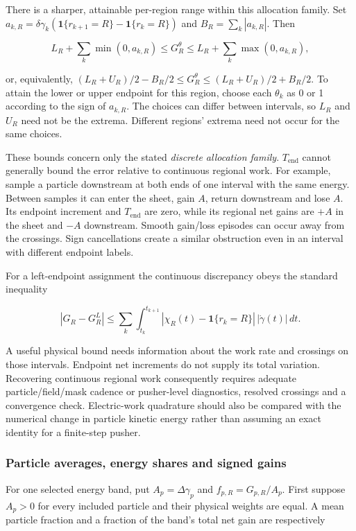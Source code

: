 There is a sharper, attainable per-region range within this allocation
family. Set
\(a_{k,R}=\delta\gamma_k(\mathbf1\{r_{k+1}=R\}-\mathbf1\{r_k=R\})\) and
\(B_R=\sum_k|a_{k,R}|\). Then

\[
L_R+\sum_k\min(0,a_{k,R})\leq G_R^{\theta}
\leq L_R+\sum_k\max(0,a_{k,R}),
\]

or, equivalently, \((L_R+U_R)/2-B_R/2\leq G_R^{\theta}
\leq(L_R+U_R)/2+B_R/2\). To attain the lower or upper endpoint for this
region, choose each \(\theta_k\) as 0 or 1 according to the sign of
\(a_{k,R}\). The choices can differ between intervals, so \(L_R\) and
\(U_R\) need not be the extrema. Different regions' extrema need not
occur for the same choices.

These bounds concern only the stated \emph{discrete allocation family}.
\(T_{\mathrm{end}}\) cannot generally bound the error relative to
continuous regional work. For example, sample a particle downstream at
both ends of one interval with the same energy. Between samples it can
enter the sheet, gain \(A\), return downstream and lose \(A\). Its
endpoint increment and \(T_{\mathrm{end}}\) are zero, while its regional
net gains are \(+A\) in the sheet and \(-A\) downstream. Smooth
gain/loss episodes can occur away from the crossings. Sign cancellations
create a similar obstruction even in an interval with different endpoint
labels.

For a left-endpoint assignment the continuous discrepancy obeys the
standard inequality

\[
|G_R-G_R^L|\leq\sum_k\int_{t_k}^{t_{k+1}}
 |\chi_R(t)-\mathbf1\{r_k=R\}|\,|\dot\gamma(t)|\,dt.
\]

A useful physical bound needs information about the work rate and
crossings on those intervals. Endpoint net increments do not supply its
total variation. Recovering continuous regional work consequently
requires adequate particle/field/mask cadence or pusher-level
diagnostics, resolved crossings and a convergence check. Electric-work
quadrature should also be compared with the numerical change in particle
kinetic energy rather than assuming an exact identity for a finite-step
pusher.

\subsubsection{Particle averages, energy shares and signed
gains}\label{particle-averages-energy-shares-and-signed-gains}

For one selected energy band, put \(A_p=\Delta\gamma_p\) and
\(f_{p,R}=G_{p,R}/A_p\). First suppose \(A_p>0\) for every included
particle and their physical weights are equal. A mean particle fraction
and a fraction of the band's total net gain are respectively

